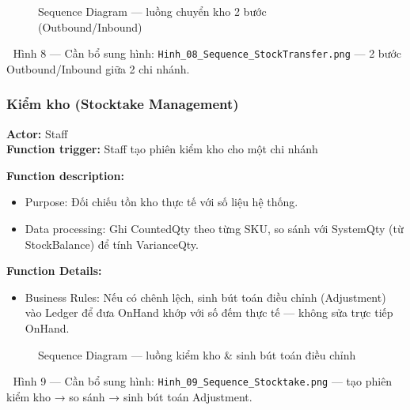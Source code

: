 \begin{figure}[H]
    \centering
    \caption{Sequence Diagram — luồng chuyển kho 2 bước (Outbound/Inbound)}
    \label{fig:seq-stock-transfer}
\end{figure}
\begin{imgnote}
📌 Hình 8 — Cần bổ sung hình: \texttt{Hinh\_08\_Sequence\_StockTransfer.png} — 2 bước Outbound/Inbound giữa 2 chi nhánh.
\end{imgnote}

\subsubsection{Kiểm kho (Stocktake Management)}
\textbf{Actor:} Staff \\
\textbf{Function trigger:} Staff tạo phiên kiểm kho cho một chi nhánh

\textbf{Function description:}
\begin{itemize}
    \item Purpose: Đối chiếu tồn kho thực tế với số liệu hệ thống.
    \item Data processing: Ghi CountedQty theo từng SKU, so sánh với SystemQty (từ StockBalance) để tính VarianceQty.
\end{itemize}

\textbf{Function Details:}
\begin{itemize}
    \item Business Rules: Nếu có chênh lệch, sinh bút toán điều chỉnh (Adjustment) vào Ledger để đưa OnHand khớp với số đếm thực tế — không sửa trực tiếp OnHand.
\end{itemize}

\begin{figure}[H]
    \centering
    \caption{Sequence Diagram — luồng kiểm kho \& sinh bút toán điều chỉnh}
    \label{fig:seq-stocktake}
\end{figure}
\begin{imgnote}
📌 Hình 9 — Cần bổ sung hình: \texttt{Hinh\_09\_Sequence\_Stocktake.png} — tạo phiên kiểm kho → so sánh → sinh bút toán Adjustment.
\end{imgnote}
\FloatBarrier

